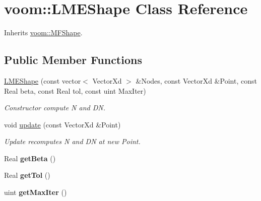\hypertarget{classvoom_1_1_l_m_e_shape}{
\section{voom::LMEShape Class Reference}
\label{classvoom_1_1_l_m_e_shape}
}


Inherits \hyperlink{classvoom_1_1_m_f_shape}{voom::MFShape}.\subsection*{Public Member Functions}
\begin{DoxyCompactItemize}
\item 
\hypertarget{classvoom_1_1_l_m_e_shape_a9afd8a975a8a30cb9d55bd6eb3cf1d6c}{
\hyperlink{classvoom_1_1_l_m_e_shape_a9afd8a975a8a30cb9d55bd6eb3cf1d6c}{LMEShape} (const vector$<$ VectorXd $>$ \&Nodes, const VectorXd \&Point, const Real beta, const Real tol, const uint MaxIter)}
\label{classvoom_1_1_l_m_e_shape_a9afd8a975a8a30cb9d55bd6eb3cf1d6c}

\begin{DoxyCompactList}\small\item\em Constructor compute N and DN. \item\end{DoxyCompactList}\item 
\hypertarget{classvoom_1_1_l_m_e_shape_a6b4c73c86b99c4310af661566c0aac9e}{
void \hyperlink{classvoom_1_1_l_m_e_shape_a6b4c73c86b99c4310af661566c0aac9e}{update} (const VectorXd \&Point)}
\label{classvoom_1_1_l_m_e_shape_a6b4c73c86b99c4310af661566c0aac9e}

\begin{DoxyCompactList}\small\item\em Update recomputes N and DN at new Point. \item\end{DoxyCompactList}\item 
\hypertarget{classvoom_1_1_l_m_e_shape_ae0f2e8f6ea3eaac66f3c803d9ddc8238}{
Real {\bfseries getBeta} ()}
\label{classvoom_1_1_l_m_e_shape_ae0f2e8f6ea3eaac66f3c803d9ddc8238}

\item 
\hypertarget{classvoom_1_1_l_m_e_shape_a0697a62729c909168548b40d8c812e87}{
Real {\bfseries getTol} ()}
\label{classvoom_1_1_l_m_e_shape_a0697a62729c909168548b40d8c812e87}

\item 
\hypertarget{classvoom_1_1_l_m_e_shape_ac562de49c9a3d01661bb7c52e84047f8}{
uint {\bfseries getMaxIter} ()}
\label{classvoom_1_1_l_m_e_shape_ac562de49c9a3d01661bb7c52e84047f8}


\end{DoxyCompactItemize}
